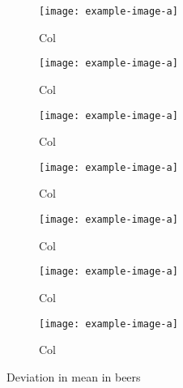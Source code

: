 \begin{figure}[!t]
    \centering 
    \centering
\begin{subfigure}{0.4\textwidth}
    \texttt{[image: example-image-a]}
    \caption{Col}
    \label{exp::deviation_mean_beers_1}
\end{subfigure}
\hfill
\begin{subfigure}{0.4\textwidth}
    \texttt{[image: example-image-a]}
    \caption{Col}
    \label{exp:deviation_mean_beers_2}
\end{subfigure}
\hfill
\begin{subfigure}{0.4\textwidth}
    \texttt{[image: example-image-a]}
    \caption{Col}
    \label{fig:deviation_mean_beers_3}
\end{subfigure}
\hfill
\begin{subfigure}{0.4\textwidth}
    \texttt{[image: example-image-a]}
    \caption{Col}
    \label{exp:deviation_mean_beers_4}
\end{subfigure}
\hfill
\begin{subfigure}{0.4\textwidth}
    \texttt{[image: example-image-a]}
    \caption{Col}
    \label{exp:deviation_mean_beers_5}
\end{subfigure}
\hfill
\begin{subfigure}{0.4\textwidth}
    \texttt{[image: example-image-a]}
    \caption{Col}
    \label{exp:deviation_mean_beers_6}
\end{subfigure}
\hfill
\begin{subfigure}{0.4\textwidth}
    \texttt{[image: example-image-a]}
    \caption{Col}
    \label{exp:deviation_mean_beers_7}
\end{subfigure}
\caption{Deviation in mean in beers}
\label{exp:deviation_mean_beers}
\end{figure}

